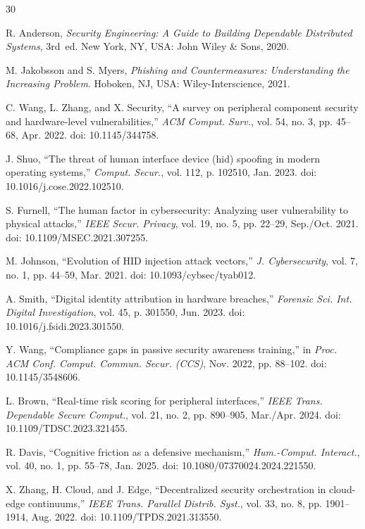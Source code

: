 \documentclass{ieeeaccess}
\begin{document}
\nocite{*}

\begin{thebibliography}{30}

R. Anderson, {\em Security Engineering: A Guide to Building Dependable Distributed Systems}, 3rd~ed. New York, NY, USA: John Wiley \& Sons, 2020.

M. Jakobsson and S. Myers, {\em Phishing and Countermeasures: Understanding the Increasing Problem}. Hoboken, NJ, USA: Wiley-Interscience, 2021.

C. Wang, L. Zhang, and X. Security, ``A survey on peripheral component security and hardware-level vulnerabilities,'' {\em ACM Comput. Surv.}, vol. 54, no. 3, pp. 45--68, Apr. 2022. doi: 10.1145/344758.

J. Shuo, ``The threat of human interface device (hid) spoofing in modern operating systems,'' {\em Comput. Secur.}, vol. 112, p. 102510, Jan. 2023. doi: 10.1016/j.cose.2022.102510.

S. Furnell, ``The human factor in cybersecurity: Analyzing user vulnerability to physical attacks,'' {\em IEEE Secur. Privacy}, vol. 19, no. 5, pp. 22--29, Sep./Oct. 2021. doi: 10.1109/MSEC.2021.307255.

M. Johnson, ``Evolution of HID injection attack vectors,'' {\em J. Cybersecurity}, vol. 7, no. 1, pp. 44--59, Mar. 2021. doi: 10.1093/cybsec/tyab012.

A. Smith, ``Digital identity attribution in hardware breaches,'' {\em Forensic Sci. Int. Digital Investigation}, vol. 45, p. 301550, Jun. 2023. doi: 10.1016/j.fsidi.2023.301550.

Y. Wang, ``Compliance gaps in passive security awareness training,'' in {\em Proc. ACM Conf. Comput. Commun. Secur. (CCS)}, Nov. 2022, pp. 88--102. doi: 10.1145/3548606.

L. Brown, ``Real-time risk scoring for peripheral interfaces,'' {\em IEEE Trans. Dependable Secure Comput.}, vol. 21, no. 2, pp. 890--905, Mar./Apr. 2024. doi: 10.1109/TDSC.2023.321455.

R. Davis, ``Cognitive friction as a defensive mechanism,'' {\em Hum.-Comput. Interact.}, vol. 40, no. 1, pp. 55--78, Jan. 2025. doi: 10.1080/07370024.2024.221550.

X. Zhang, H. Cloud, and J. Edge, ``Decentralized security orchestration in cloud-edge continuums,'' {\em IEEE Trans. Parallel Distrib. Syst.}, vol. 33, no. 8, pp. 1901--1914, Aug. 2022. doi: 10.1109/TPDS.2021.313550.


\end{thebibliography}
\end{document}
